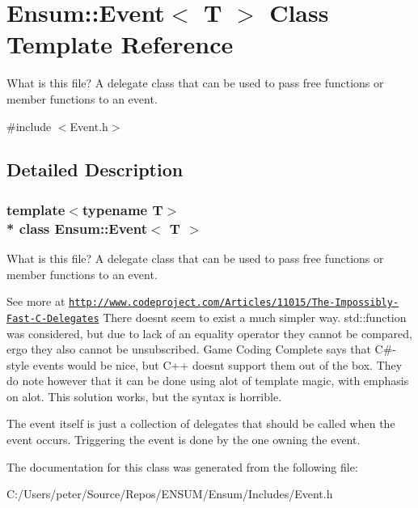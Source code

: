 \hypertarget{class_ensum_1_1_event}{}\section{Ensum\+:\+:Event$<$ T $>$ Class Template Reference}
\label{class_ensum_1_1_event}


What is this file? A delegate class that can be used to pass free functions or member functions to an event.  




{\ttfamily \#include $<$Event.\+h$>$}



\subsection{Detailed Description}
\subsubsection*{template$<$typename T$>$\\*
class Ensum\+::\+Event$<$ T $>$}

What is this file? A delegate class that can be used to pass free functions or member functions to an event. 

See more at \href{http://www.codeproject.com/Articles/11015/The-Impossibly-Fast-C-Delegates}{\tt http\+://www.\+codeproject.\+com/\+Articles/11015/\+The-\/\+Impossibly-\/\+Fast-\/\+C-\/\+Delegates} There doesn\textquotesingle{}t seem to exist a much simpler way. std\+::function was considered, but due to lack of an equality operator they cannot be compared, ergo they also cannot be unsubscribed. Game Coding Complete says that C\#-\/style events would be nice, but C++ doesn\textquotesingle{}t support them out of the box. They do note however that it can be done using alot of template magic, with emphasis on alot. This solution works, but the syntax is horrible.

The event itself is just a collection of delegates that should be called when the event occurs. Triggering the event is done by the one owning the event. 

The documentation for this class was generated from the following file\+:\begin{DoxyCompactItemize}
\item 
C\+:/\+Users/peter/\+Source/\+Repos/\+E\+N\+S\+U\+M/\+Ensum/\+Includes/Event.\+h\end{DoxyCompactItemize}
